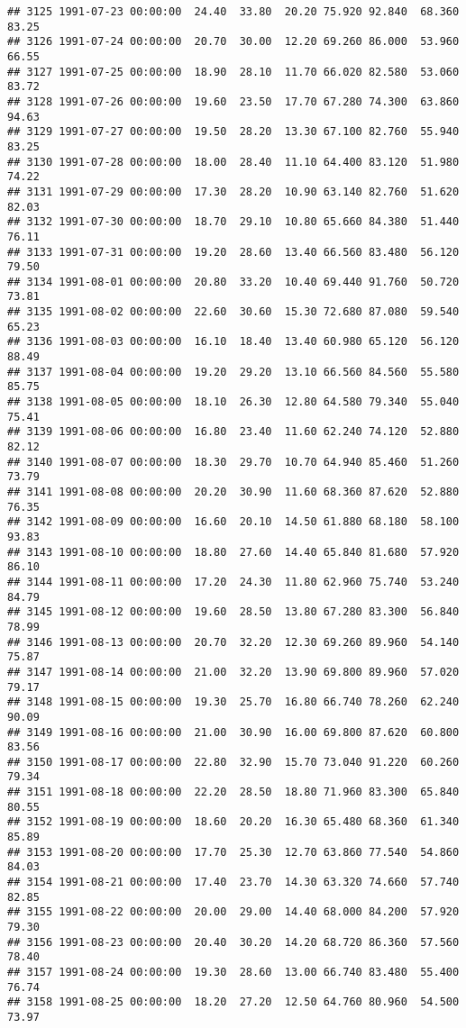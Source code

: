 \documentclass{article}\usepackage{graphicx, color}
\makeatletter
\newenvironment{kframe}{%
 \def\at@end@of@kframe{}%
 \ifinner\ifhmode%
  \def\at@end@of@kframe{\end{minipage}}%
  \begin{minipage}{\columnwidth}%
 \fi\fi%
 \def\FrameCommand##1{\hskip\@totalleftmargin \hskip-\fboxsep
 \colorbox{shadecolor}{##1}\hskip-\fboxsep
     \hskip-\linewidth \hskip-\@totalleftmargin \hskip\columnwidth}%
 \MakeFramed {\advance\hsize-\width
   \@totalleftmargin\z@ \linewidth\hsize
   \@setminipage}}%
 {\par\unskip\endMakeFramed%
 \at@end@of@kframe}
\newenvironment{knitrout}{}{} %
\makeatother
\begin{document}
\begin{knitrout}
\begin{kframe}
\begin{verbatim}
## 3125 1991-07-23 00:00:00  24.40  33.80  20.20 75.920 92.840  68.360  83.25
## 3126 1991-07-24 00:00:00  20.70  30.00  12.20 69.260 86.000  53.960  66.55
## 3127 1991-07-25 00:00:00  18.90  28.10  11.70 66.020 82.580  53.060  83.72
## 3128 1991-07-26 00:00:00  19.60  23.50  17.70 67.280 74.300  63.860  94.63
## 3129 1991-07-27 00:00:00  19.50  28.20  13.30 67.100 82.760  55.940  83.25
## 3130 1991-07-28 00:00:00  18.00  28.40  11.10 64.400 83.120  51.980  74.22
## 3131 1991-07-29 00:00:00  17.30  28.20  10.90 63.140 82.760  51.620  82.03
## 3132 1991-07-30 00:00:00  18.70  29.10  10.80 65.660 84.380  51.440  76.11
## 3133 1991-07-31 00:00:00  19.20  28.60  13.40 66.560 83.480  56.120  79.50
## 3134 1991-08-01 00:00:00  20.80  33.20  10.40 69.440 91.760  50.720  73.81
## 3135 1991-08-02 00:00:00  22.60  30.60  15.30 72.680 87.080  59.540  65.23
## 3136 1991-08-03 00:00:00  16.10  18.40  13.40 60.980 65.120  56.120  88.49
## 3137 1991-08-04 00:00:00  19.20  29.20  13.10 66.560 84.560  55.580  85.75
## 3138 1991-08-05 00:00:00  18.10  26.30  12.80 64.580 79.340  55.040  75.41
## 3139 1991-08-06 00:00:00  16.80  23.40  11.60 62.240 74.120  52.880  82.12
## 3140 1991-08-07 00:00:00  18.30  29.70  10.70 64.940 85.460  51.260  73.79
## 3141 1991-08-08 00:00:00  20.20  30.90  11.60 68.360 87.620  52.880  76.35
## 3142 1991-08-09 00:00:00  16.60  20.10  14.50 61.880 68.180  58.100  93.83
## 3143 1991-08-10 00:00:00  18.80  27.60  14.40 65.840 81.680  57.920  86.10
## 3144 1991-08-11 00:00:00  17.20  24.30  11.80 62.960 75.740  53.240  84.79
## 3145 1991-08-12 00:00:00  19.60  28.50  13.80 67.280 83.300  56.840  78.99
## 3146 1991-08-13 00:00:00  20.70  32.20  12.30 69.260 89.960  54.140  75.87
## 3147 1991-08-14 00:00:00  21.00  32.20  13.90 69.800 89.960  57.020  79.17
## 3148 1991-08-15 00:00:00  19.30  25.70  16.80 66.740 78.260  62.240  90.09
## 3149 1991-08-16 00:00:00  21.00  30.90  16.00 69.800 87.620  60.800  83.56
## 3150 1991-08-17 00:00:00  22.80  32.90  15.70 73.040 91.220  60.260  79.34
## 3151 1991-08-18 00:00:00  22.20  28.50  18.80 71.960 83.300  65.840  80.55
## 3152 1991-08-19 00:00:00  18.60  20.20  16.30 65.480 68.360  61.340  85.89
## 3153 1991-08-20 00:00:00  17.70  25.30  12.70 63.860 77.540  54.860  84.03
## 3154 1991-08-21 00:00:00  17.40  23.70  14.30 63.320 74.660  57.740  82.85
## 3155 1991-08-22 00:00:00  20.00  29.00  14.40 68.000 84.200  57.920  79.30
## 3156 1991-08-23 00:00:00  20.40  30.20  14.20 68.720 86.360  57.560  78.40
## 3157 1991-08-24 00:00:00  19.30  28.60  13.00 66.740 83.480  55.400  76.74
## 3158 1991-08-25 00:00:00  18.20  27.20  12.50 64.760 80.960  54.500  73.97

\end{verbatim}
\end{kframe}
\end{knitrout}
\end{document}
